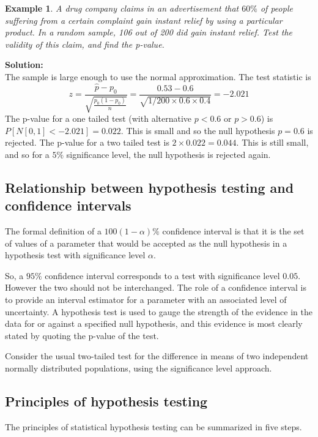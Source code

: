 \documentclass[12pt]{article}
\newtheorem{example}[theorem]{Example}
\begin{document}
\begin{example}
A drug company claims in an advertisement that $60\%$ of people suffering from a certain complaint gain instant relief by using a particular product. In a random sample, 106 out of 200 did gain instant relief. Test the validity of this claim, and find the p-value.
\end{example}

\begin{mdframed}
{\bf Solution:}\\
The sample is large enough to use the normal approximation. The test statistic is $$z=\frac{\hat{p}-p_0}{\sqrt{\frac{p_0(1-p_0)}{n}}}=\frac{0.53-0.6}{\sqrt{1/200 \times 0.6 \times 0.4}}=-2.021$$
The p-value for a one tailed test (with alternative $p<0.6$ or $p>0.6$) is $P[N[0,1]<-2.021]=0.022$. This is small and so the null hypothesis $p=0.6$ is rejected. The p-value for a two tailed test is $2 \times 0.022=0.044$. This is still small, and so for a $5\%$ significance level, the null hypothesis is rejected again.
\end{mdframed}

\subsection{Relationship between hypothesis testing and confidence intervals}
The formal definition of a $100(1-\alpha)\%$ confidence interval is that it is the set of values of a parameter that would be accepted as the null hypothesis in a hypothesis test with significance level $\alpha.$

So, a $95\%$ confidence interval corresponds to a test with significance level $0.05.$ However the two should not be interchanged. The role of a confidence interval is to provide an interval estimator for a parameter with an associated level of uncertainty. A hypothesis test is used to gauge the strength of the evidence in the data for or against a specified null hypothesis, and this evidence is most clearly stated by quoting the p-value of the test.

\begin{mdframed}
Consider the usual two-tailed test for the difference in means of two independent normally distributed populations, using the significance level approach.
\textcolor[rgb]{1.00,1.00,1.00}{\lipsum[1-6]}
\end{mdframed}


\subsection{Principles of hypothesis testing}
The principles of statistical hypothesis testing can be summarized in five steps.
\end{document}
